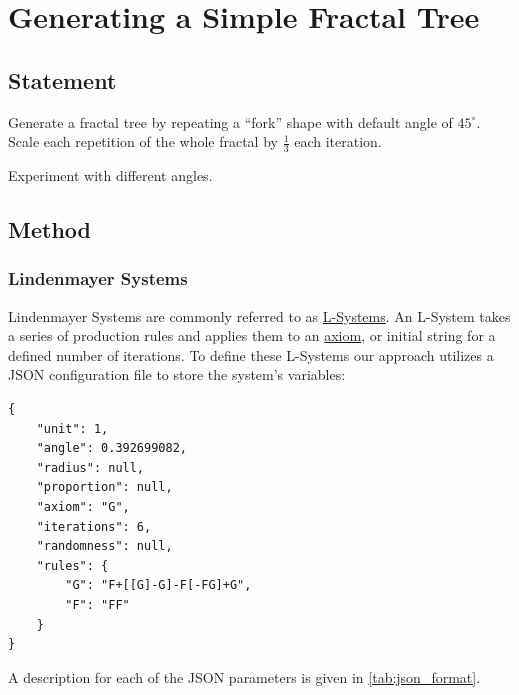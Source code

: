 \section{Generating a Simple Fractal Tree}

\subsection{Statement}

Generate a fractal tree by repeating a ``fork'' shape with default angle of $45^\circ$.
Scale each repetition of the whole fractal by $\frac{1}{3}$ each iteration.

Experiment with different angles.

\subsection{Method}\label{sec:l-system-method}

\subsubsection{Lindenmayer Systems}
Lindenmayer Systems are commonly referred to as
\href{https://en.wikipedia.org/wiki/L-system}{L-Systems}. An L-System takes a
series of production rules and applies them to an
\href{https://en.wikipedia.org/wiki/Axiom}{axiom}, or initial string for a
defined number of iterations. To define these L-Systems our approach utilizes a
JSON configuration file to store the system's variables:

\begin{verbatim}
{
    "unit": 1,
    "angle": 0.392699082,
    "radius": null,
    "proportion": null,
    "axiom": "G",
    "iterations": 6,
    "randomness": null,
    "rules": {
        "G": "F+[[G]-G]-F[-FG]+G",
        "F": "FF"
    }
}
\end{verbatim}

A description for each of the JSON parameters is given in \autoref{tab:json_format}.

